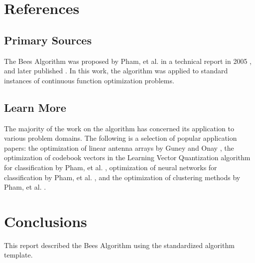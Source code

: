 \documentclass[a4paper, 11pt]{article}
\begin{document}



\section{References}
\label{sec:references}

% 
% 
\subsection{Primary Sources}
The Bees Algorithm was proposed by Pham, et al. in a technical report in 2005 \cite{Pham2005}, and later published \cite{Pham2006}. In this work, the algorithm was applied to standard instances of continuous function optimization problems.

% 
% 
\subsection{Learn More}
The majority of the work on the algorithm has concerned its application to various problem domains.
The following is a selection of popular application papers: the optimization of linear antenna arrays by Guney and Onay \cite{Guney2007}, the optimization of codebook vectors in the Learning Vector Quantization algorithm for classification by Pham, et al. \cite{Pham2006a}, optimization of neural networks for classification by Pham, et al. \cite{Pham2006b}, and the optimization of clustering methods by Pham, et al. \cite{Pham2007}.


% 
% 
\section{Conclusions}
\label{sec:conclusions}
This report described the Bees Algorithm using the standardized algorithm template.
\end{document}
